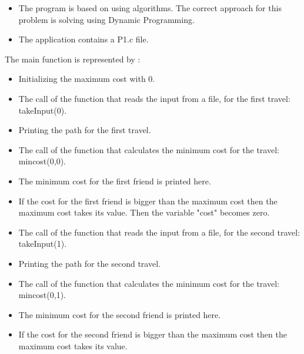 \documentclass{article}
\begin{document}
\begin{itemize}
    
\item
The program is based on using algorithms. The correct approach for this problem is solving using Dynamic Programming.\end{itemize}
\begin{itemize}
  \item The application contains a P1.c file.
 
  \end{itemize}
  The main function is represented by :
  \begin{itemize}
  \item Initializing the maximum cost with 0.
  \end{itemize}
  \begin{itemize}
  \item The call of the function that reads the input from a file, for the first travel:  {takeInput(0)}.
  \end{itemize}
  \begin{itemize}
  \item Printing the path for the first travel.
  \end{itemize}
  \begin{itemize}
  \item The call of the function that calculates the minimum cost for the travel: {mincost(0,0)}.
  \end{itemize}
  \begin{itemize}
  \item The minimum cost for the first friend is printed here.
  \end{itemize}
  \begin{itemize}
  \item If the cost for the first friend is bigger than the maximum cost then the maximum cost takes its value. Then the variable "cost" becomes zero.
  \end{itemize}
  \begin{itemize}
  \item The call of the function that reads the input from a file, for the second travel:  {takeInput(1)}.
  \end{itemize}
  \begin{itemize}
  \item Printing the path for the second travel.
  \end{itemize}
  \begin{itemize}
  \item The call of the function that calculates the minimum cost for the travel: {mincost(0,1)}.
  \end{itemize}
  \begin{itemize}
  \item The minimum cost for the second friend is printed here.
  \end{itemize}
  \begin{itemize}
  \item If the cost for the second friend is bigger than the maximum cost then the maximum cost takes its value. 
  \end{itemize}
  
\end{document}
